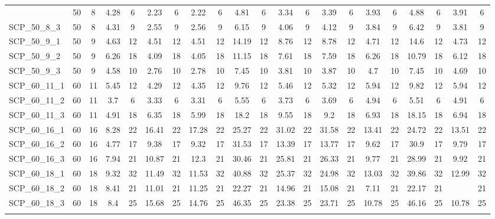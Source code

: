 \begin{sidewaystable}[!ht]
{\begin{tabular}{lcccccccccccccccccccc}
{SCP\_50\_8\_2 & 50 & 8 & 4.28 & 6 & 2.23 & 6 &  \textcolor{blue2}{2.22} & 6 & 4.81 & 6 & 3.34 & 6 & 3.39 & 6 & 3.93 & 6 & 4.88 & 6 & 3.91 & 6 \\
SCP\_50\_8\_3 & 50 & 8 & 4.31 & 9 &  \textcolor{blue2}{2.55} & 9 & 2.56 & 9 & 6.15 & 9 & 4.06 & 9 & 4.12 & 9 & 3.84 & 9 & 6.42 & 9 & 3.81 & 9 \\
SCP\_50\_9\_1 & 50 & 9 & 4.63 & 12 &  \textcolor{blue2}{4.51} & 12 &  \textcolor{blue2}{4.51} & 12 & 14.19 & 12 & 8.76 & 12 & 8.78 & 12 & 4.71 & 12 & 14.6 & 12 & 4.73 & 12 \\
SCP\_50\_9\_2 & 50 & 9 & 6.26 & 18 & 4.09 & 18 &  \textcolor{blue2}{4.05} & 18 & 11.15 & 18 & 7.61 & 18 & 7.59 & 18 & 6.26 & 18 & 10.79 & 18 & 6.12 & 18 \\
SCP\_50\_9\_3 & 50 & 9 & 4.58 & 10 &  \textcolor{blue2}{2.76} & 10 & 2.78 & 10 & 7.45 & 10 & 3.81 & 10 & 3.87 & 10 & 4.7 & 10 & 7.45 & 10 & 4.69 & 10 \\
SCP\_60\_11\_1 & 60 & 11 & 5.45 & 12 &  \textcolor{blue2}{4.29} & 12 & 4.35 & 12 & 9.76 & 12 & 5.46 & 12 & 5.32 & 12 & 5.94 & 12 & 9.82 & 12 & 5.94 & 12 \\
SCP\_60\_11\_2 & 60 & 11 & 3.7 & 6 & 3.33 & 6 &  \textcolor{blue2}{3.31} & 6 & 5.55 & 6 & 3.73 & 6 & 3.69 & 6 & 4.94 & 6 & 5.51 & 6 & 4.91 & 6 \\
SCP\_60\_11\_3 & 60 & 11 &  \textcolor{blue2}{4.91} & 18 & 6.35 & 18 & 5.99 & 18 & 18.2 & 18 & 9.55 & 18 & 9.2 & 18 & 6.93 & 18 & 18.15 & 18 & 6.94 & 18 \\
SCP\_60\_16\_1 & 60 & 16 &  \textcolor{blue2}{8.28} & 22 & 16.41 & 22 & 17.28 & 22 & 25.27 & 22 & 31.02 & 22 & 31.58 & 22 & 13.41 & 22 & 24.72 & 22 & 13.51 & 22 \\
SCP\_60\_16\_2 & 60 & 16 &  \textcolor{blue2}{4.77} & 17 & 9.38 & 17 & 9.32 & 17 & 31.53 & 17 & 13.39 & 17 & 13.77 & 17 & 9.62 & 17 & 30.9 & 17 & 9.79 & 17 \\
SCP\_60\_16\_3 & 60 & 16 &  \textcolor{blue2}{7.94} & 21 & 10.87 & 21 & 12.3 & 21 & 30.46 & 21 & 25.81 & 21 & 26.33 & 21 & 9.77 & 21 & 28.99 & 21 & 9.92 & 21 \\
SCP\_60\_18\_1 & 60 & 18 &  \textcolor{blue2}{9.32} & 32 & 11.49 & 32 & 11.53 & 32 & 40.88 & 32 & 25.37 & 32 & 24.98 & 32 & 13.03 & 32 & 39.86 & 32 & 12.99 & 32 \\
SCP\_60\_18\_2 & 60 & 18 & 8.41 & 21 & 11.01 & 21 & 11.25 & 21 & 22.27 & 21 & 14.96 & 21 & 15.08 & 21 & 7.11 & 21 & 22.17 & 21 &  \textcolor{blue2}{7.04 & 21 \\
SCP\_60\_18\_3 & 60 & 18 &  \textcolor{blue2}{8.4} & 25 & 15.68 & 25 & 14.76 & 25 & 46.35 & 25 & 23.38 & 25 & 23.71 & 25 & 10.78 & 25 & 46.16 & 25 & 10.78 & 25 \\
}}
\end{tabular}}
\end{sidewaystable}
